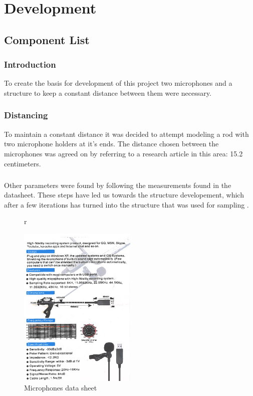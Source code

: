 \chapter{Development}\label{Development}
\section{Component List}
\subsection{Introduction}
To create the basis for development of this project two microphones and a structure to keep a constant distance between them were necessary.  
\subsection{Distancing}
To maintain a constant distance it was decided to attempt modeling a rod with two microphone holders at it's ends. The distance chosen between the microphones was agreed on by referring to a research article in this area: 15.2 centimeters. 
\paragraph{}
Other parameters were found by following the measurements found in the datasheet. These steps have led us towards the structure developement, which after a few iterations has turned into the structure that was used for sampling .
\begin{figure} {r}
  \caption{Microphones data sheet}
  \centering
    \includegraphics[width=0.5\textwidth]{Illustrations/MicData}
\end{figure}

